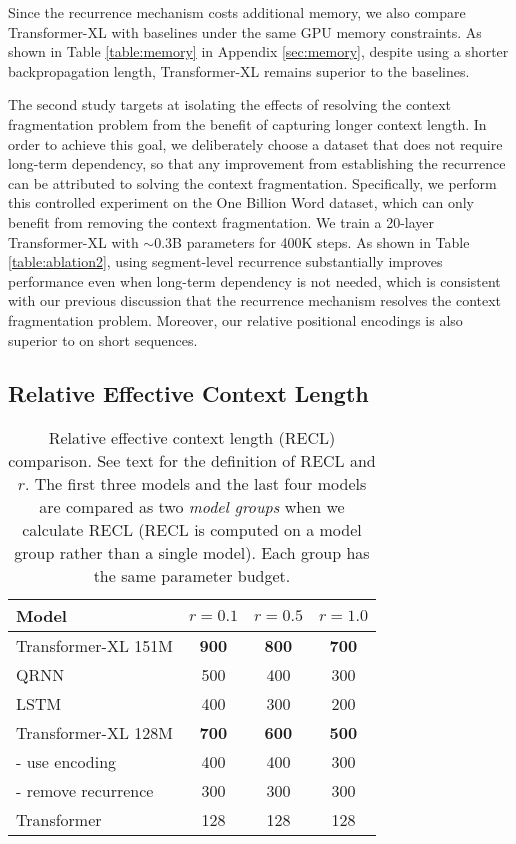 \documentclass[11pt,a4paper]{article}
\begin{document}
Since the recurrence mechanism costs additional memory, we also compare Transformer-XL with baselines under the same GPU memory constraints. As shown in Table \ref{table:memory} in Appendix \ref{sec:memory}, despite using a shorter backpropagation length, Transformer-XL remains superior to the baselines.

The second study targets at isolating the effects of resolving the context fragmentation problem from the benefit of capturing longer context length.
In order to achieve this goal, we deliberately choose a dataset that does not require long-term dependency, so that any improvement from establishing the recurrence can be attributed to solving the context fragmentation.
Specifically, we perform this controlled experiment on the One Billion Word dataset, which can only benefit from removing the context fragmentation. We train a 20-layer Transformer-XL with $\sim$0.3B parameters for 400K steps.
As shown in Table \ref{table:ablation2}, using segment-level recurrence substantially improves performance even when long-term dependency is not needed, which is consistent with our previous discussion that the recurrence mechanism resolves the context fragmentation problem. Moreover, our relative positional encodings is also superior to \citet{shaw2018self} on short sequences.


\subsection{Relative Effective Context Length}
\bgroup
\setlength{\tabcolsep}{2pt}
\begin{table}[t]
	\small
	\centering
	\begin{tabular}{lccc}
		\toprule
		\bf Model & $r=0.1$ & $r=0.5$ & $r=1.0$ \\
		\midrule
		Transformer-XL 151M & \textbf{900} & \textbf{800} & \textbf{700} \\
		QRNN & 500 & 400 & 300 \\
		LSTM & 400 & 300 & 200 \\
		\midrule
		Transformer-XL 128M & \textbf{700} & \textbf{600} & \textbf{500} \\
		- use \citet{shaw2018self} encoding & 400 & 400 & 300 \\
		- remove recurrence & 300 & 300 & 300 \\
		Transformer & 128 & 128 & 128 \\
		\bottomrule
	\end{tabular}
	\caption{\small
		Relative effective context length (RECL) comparison. See text for the definition of RECL and $r$. The first three models and the last four models are
		compared as two \textit{model groups} when we calculate RECL (RECL is computed on a model group rather than a single model). Each group has the same parameter budget.
	}
	\label{table:recl}
\end{table}
\egroup
\end{document}
